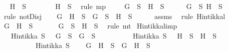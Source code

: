 \begin{isabellebody}
\ \isamarkupfalse%
\ {\isachardoublequoteopen}H\ {\isasymnotin}\ S{\isachardoublequoteclose}\ \isanewline
\ \ \ \ \isamarkupfalse%
\ {\isacartoucheopen}\isactrlbold {\isasymnot}\ H\ {\isasymin}\ S{\isacartoucheclose}\ \isamarkupfalse%
\ {\isacharparenleft}rule\ mp{\isacharparenright}\isanewline
\ \ \isamarkupfalse%
\ {\isachardoublequoteopen}{\isasymnot}\ {\isacharparenleft}G\ {\isasymin}\ S\ {\isasymor}\ H\ {\isasymin}\ S{\isacharparenright}{\isachardoublequoteclose}\isanewline
\ \ \ \ \isamarkupfalse%
\ {\isacartoucheopen}G\ {\isasymnotin}\ S{\isacartoucheclose}\ {\isacartoucheopen}H\ {\isasymnotin}\ S{\isacartoucheclose}\ \isamarkupfalse%
\ {\isacharparenleft}rule\ notDisj{\isacharparenright}\isanewline
\ \ \isamarkupfalse%
\ {\isachardoublequoteopen}{\isacharparenleft}G\ \isactrlbold {\isasymor}\ H\ {\isasymin}\ S\ {\isasymlongrightarrow}\ G\ {\isasymin}\ S\ {\isasymor}\ H\ {\isasymin}\ S{\isacharparenright}{\isachardoublequoteclose}\isanewline
\ \ \ \ \isamarkupfalse%
\ assms{\isacharparenleft}{}{\isacharparenright}\ \isamarkupfalse%
\ {\isacharparenleft}rule\ Hintikka{\isacharunderscore}l{}{\isacharparenright}\isanewline
\ \ \isamarkupfalse%
\ {\isachardoublequoteopen}G\ \isactrlbold {\isasymor}\ H\ {\isasymnotin}\ S{\isachardoublequoteclose}\isanewline
\ \ \ \ \isamarkupfalse%
\ {\isacartoucheopen}{\isasymnot}\ {\isacharparenleft}G\ {\isasymin}\ S\ {\isasymor}\ H\ {\isasymin}\ S{\isacharparenright}{\isacartoucheclose}\ \isamarkupfalse%
\ {\isacharparenleft}rule\ mt{\isacharparenright}\isanewline
{}\isamarkupfalse%
%
\endisatagproof
{\isafoldproof}%
%
\isadelimproof
\isanewline
%
\endisadelimproof
\isanewline
{}\isamarkupfalse%
\ Hintikka{\isacharunderscore}l{}{}{\isacharunderscore}imp{\isacharcolon}\ \isanewline
\ \ \ {\isachardoublequoteopen}Hintikka\ S\ {\isasymLongrightarrow}\ \isactrlbold {\isasymnot}\ G\ {\isasymin}\ S\ {\isasymlongrightarrow}\ G\ {\isasymnotin}\ S{\isachardoublequoteclose}\isanewline
\ \ \ \ \ \ \ \ \ \ {\isachardoublequoteopen}Hintikka\ S\ {\isasymLongrightarrow}\ \isactrlbold {\isasymnot}\ H\ {\isasymin}\ S\ {\isasymlongrightarrow}\ H\ {\isasymnotin}\ S{\isachardoublequoteclose}\isanewline
\ \ \ \ \ \ \ \ \ \ {\isachardoublequoteopen}Hintikka\ S{\isachardoublequoteclose}\isanewline
\ \ \ {\isachardoublequoteopen}\isactrlbold {\isasymnot}\ {\isacharparenleft}G\ \isactrlbold {\isasymrightarrow}\ H{\isacharparenright}\ {\isasymin}\ S\ {\isasymlongrightarrow}\ G\ \isactrlbold {\isasymrightarrow}\ H\ {\isasymnotin}\ S{\isachardoublequoteclose}\isanewline

\end{isabellebody}
